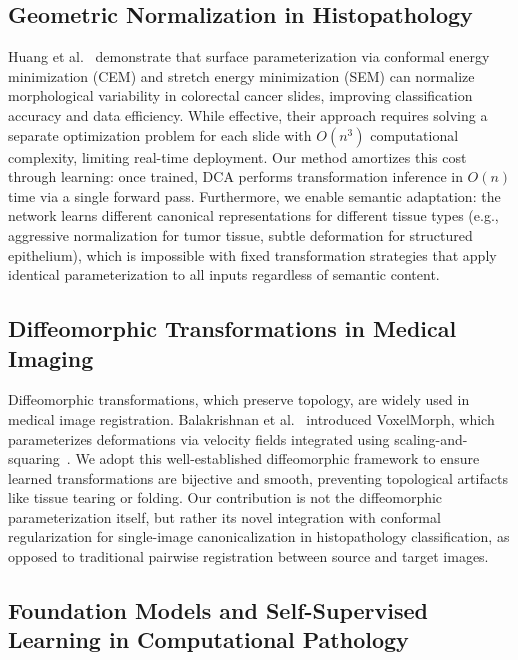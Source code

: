 \documentclass[final,3p,times,review,sort&compress]{elsarticle}
\begin{document}
\subsection{Geometric Normalization in Histopathology}

Huang et al.~\cite{huang2024surface} demonstrate that surface parameterization via conformal energy minimization (CEM) and stretch energy minimization (SEM) can normalize morphological variability in colorectal cancer slides, improving classification accuracy and data efficiency. While effective, their approach requires solving a separate optimization problem for each slide with $O(n^3)$ computational complexity, limiting real-time deployment. Our method amortizes this cost through learning: once trained, DCA performs transformation inference in $O(n)$ time via a single forward pass. Furthermore, we enable semantic adaptation: the network learns different canonical representations for different tissue types (e.g., aggressive normalization for tumor tissue, subtle deformation for structured epithelium), which is impossible with fixed transformation strategies that apply identical parameterization to all inputs regardless of semantic content.

\subsection{Diffeomorphic Transformations in Medical Imaging}

Diffeomorphic transformations, which preserve topology, are widely used in medical image registration. Balakrishnan et al.~\cite{balakrishnan2019voxelmorph} introduced VoxelMorph, which parameterizes deformations via velocity fields integrated using scaling-and-squaring~\cite{arsigny2006logdiff}. We adopt this well-established diffeomorphic framework to ensure learned transformations are bijective and smooth, preventing topological artifacts like tissue tearing or folding. Our contribution is not the diffeomorphic parameterization itself, but rather its novel integration with conformal regularization for single-image canonicalization in histopathology classification, as opposed to traditional pairwise registration between source and target images.

\subsection{Foundation Models and Self-Supervised Learning in Computational Pathology}
\end{document}
